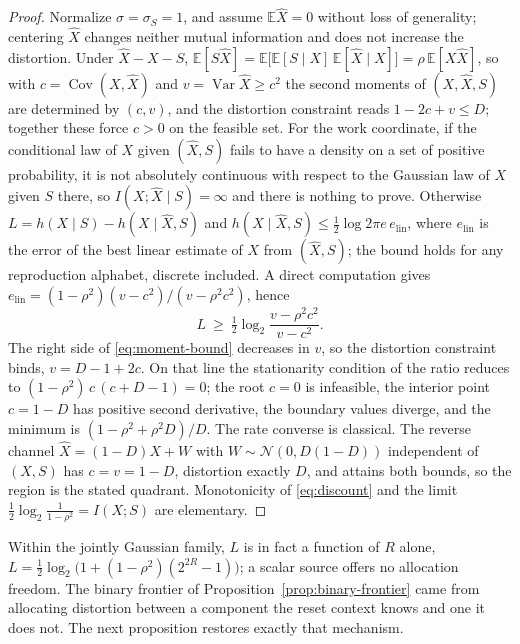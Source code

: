 \documentclass[letterpaper,onecolumn]{IEEEtran}
\theoremstyle{definition}
\theoremstyle{remark}
\newcommand{\E}{\mathbb{E}}
\newcommand{\hX}{\widehat{X}}
\newcommand{\1}{\mathbf{1}}
\begin{document}
\begin{proof}
Normalize $\sigma=\sigma_S=1$, and assume $\E\hX=0$ without loss of
generality; centering $\hX$ changes neither mutual information and does not
increase the distortion. Under $\hX-X-S$,
$\E[S\hX]=\E\bigl[\E[S\mid X]\,\E[\hX\mid X]\bigr]=\rho\,\E[X\hX]$, so with
$c=\operatorname{Cov}(X,\hX)$ and $v=\operatorname{Var}\hX\ge c^2$ the second
moments of $(X,\hX,S)$ are determined by $(c,v)$, and the distortion
constraint reads $1-2c+v\le D$; together these force $c>0$ on the feasible
set. For the work coordinate, if the conditional law of $X$ given $(\hX,S)$
fails to have a density on a set of positive probability, it is not
absolutely continuous with respect to the Gaussian law of $X$ given $S$ there,
so $I(X;\hX\mid S)=\infty$ and there is nothing to prove. Otherwise
$L=h(X\mid S)-h(X\mid\hX,S)$ and
$h(X\mid\hX,S)\le\tfrac12\log2\pi e\,e_{\mathrm{lin}}$, where
$e_{\mathrm{lin}}$ is the error of the best linear estimate of $X$ from
$(\hX,S)$; the bound holds for any reproduction alphabet, discrete included.
A direct computation gives
$e_{\mathrm{lin}}=(1-\rho^2)(v-c^2)/(v-\rho^2c^2)$, hence
\begin{equation}
 L\ \ge\ \tfrac12\log_2\frac{v-\rho^2c^2}{v-c^2}.
 \label{eq:moment-bound}
\end{equation}
The right side of \eqref{eq:moment-bound} decreases in $v$, so the distortion
constraint binds, $v=D-1+2c$. On that line the stationarity condition of the
ratio reduces to $(1-\rho^2)\,c\,(c+D-1)=0$; the root $c=0$ is infeasible,
the interior point $c=1-D$ has positive second derivative, the boundary
values diverge, and the minimum is $(1-\rho^2+\rho^2D)/D$. The
rate converse is classical. The reverse channel $\hX=(1-D)X+W$ with
$W\sim\mathcal N(0,D(1-D))$ independent of $(X,S)$ has $c=v=1-D$, distortion
exactly $D$, and attains both bounds, so the region is the stated quadrant.
Monotonicity of \eqref{eq:discount} and the limit
$\tfrac12\log_2\frac1{1-\rho^2}=I(X;S)$ are elementary.
\end{proof}

Within the jointly Gaussian family, $L$ is in fact a function of $R$ alone,
$L=\tfrac12\log_2\!\bigl(1+(1-\rho^2)(2^{2R}-1)\bigr)$; a scalar source
offers no allocation freedom. The binary frontier of
Proposition~\ref{prop:binary-frontier} came from allocating distortion
between a component the reset context knows and one it does not. The next
proposition restores exactly that mechanism.
\end{document}
